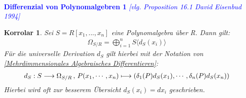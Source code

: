 \documentclass[10pt,a4paper]{report}
\newcommand{\ModulsOfDifferenzials}{David Eisenbud 1994}
\newcounter{Aussage}[chapter]
\newtheorem{korrolar}[Aussage]{Korrolar}
\newcommand{\function}[5]{\nolinebreak{#1:#2 \longrightarrow #3 \, , \, #4 \longmapsto #5}}
\newcommand{\divR}[2]{\Omega_{#1/#2}}
\newcommand{\divf}[1]{d_{#1}}
\begin{document}
\ \\
\textcolor{blue}{\textbf{Differenzial von Polynomalgebren 1} \textit{[vlg. Proposition 16.1 \ModulsOfDifferenzials]}}
\begin{korrolar}\label{Differenzial von Polynomalgebren 1}
Sei $S = R[x_1,...,x_n]$ eine Polynomalgebra über R. Dann gilt:
\begin{gather*}
\divR{S}{R} = \bigoplus_{i = 1}^n S \langle \divf{S}(x_i) \rangle 
\end{gather*}
Für die universelle Derivation $\divf{S}$ gilt hierbei mit der Notation von \cref{Mehrdimmensionales Algebraisches Differentieren}:
\begin{gather*}
\function{\divf{S}}{S}{\divR{S}{R}}{P(x_1,\cdots,x_n)}{(\delta_{1}(P)\divf{S}(x_1), \cdots , \delta_{n}(P)\divf{S}(x_n))}
\end{gather*}
Hierbei wird oft zur besserem Übersicht $\divf{S}(x_i) = dx_i$ geschrieben.
\end{korrolar}
\end{document}
